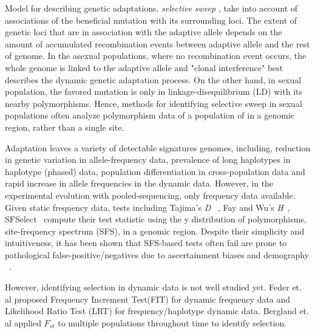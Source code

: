 \documentclass[11pt]{article}
\begin{document}
Model for describing genetic adaptations, \emph{selective sweep} 
\cite{smith1974hitch,kaplan1989hitchhiking} , take into account of associations 
of the beneficial mutation with its surrounding loci.
The extent of genetic loci that are in association with the adaptive allele 
depends on the amount of accumulated recombination events between adaptive 
allele and the rest of genome. In the asexual populations, where no 
recombination event occurs, the whole genome is linked to the adaptive allele 
and "clonal interference" \cite{desai2007beneficial,lang2013pervasive} best 
describes the dynamic 
genetic adaptation process.
On the other hand, in sexual population, the favored mutation is only in 
linkage-disequilibrium (LD) with its nearby polymorphisms. Hence, methods for 
identifying selective 
sweep in sexual populations often analyze  polymorphism data of a population of 
in a genomic region, rather than a single site. 

Adaptation leaves a variety of detectable signatures 
genomes, including, reduction in genetic 
variation\cite{tajima1989statistical,fay2000hitchhiking,ronen2013learning} in 
allele-frequency data, 
prevalence of long haplotypes 
	\cite{sabeti2006positive,vitti2013detecting} in haplotype (phased) data, 
	population differentiation \cite{holsinger2009genetics} in cross-population 
	data and 
	rapid increase in allele 
	frequencies \cite{bergland2014genomic} in the dynamic data.
However, in the experimental evolution with pooled-sequencing, only frequency 
data available. Given static frequency data, tests including
Tajima's \emph{D} ~\cite{tajima1989statistical}, 
Fay and Wu's \emph{H}~\cite{fay2000hitchhiking}, 
SFSelect~\cite{ronen2013learning} compute their test statistic using the y 
distribution of polymorphisms, site-frequency spectrum (SFS), in a genomic 
region. Despite their simplicity and intuitiveness, it has been shown that
  SFS-based tests often fail are prone to pathological false-positive/negatives
  due to ascertainment biases and  demography
  ~\cite{ptak2002evidence, ramos2002statistical,akey2009constructing, 
  nielsen2003correcting}. 

However, identifying selection in dynamic data is not well studied yet.
Feder et. al \cite{feder2014Identifying}  proposed Frequency Increment
 Test(FIT) for dynamic frequency data and Likelihood Ratio Test (LRT) for 
 frequency/haplotype dynamic data. Bergland et. al \cite{bergland2014genomic} 
 applied $F_{st}$ to multiple populations throughout time to identify selection.
 
\end{document}
